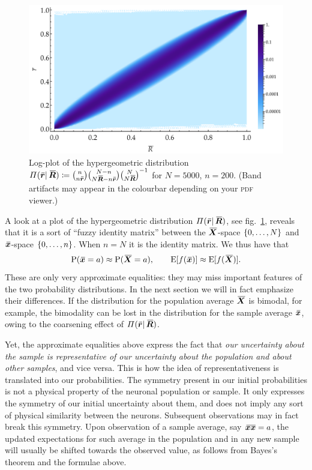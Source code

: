 \documentclass{article}
\theoremstyle{remark}
\theoremstyle{innote}
\newcommand*{\defd}{\coloneqq}
\renewcommand*{\|}{\mathpunct{|}}%
\DeclarePairedDelimiter\clcl{[}{]}
\DeclarePairedDelimiter\set{\{}{\}}
\newcommand*{\p}{\mathrm{P}}%
\newcommand*{\fig}{fig.}%
\newcommand*{\E}{\mathrm{E}}
\newcommand*{\expeb}{\E\clcl}%
\theoremstyle{simple}
\newcommand*{\widebar}[1]{{\mkern1.5mu\skew{2}\overline{\mkern-1.5mu#1\mkern-1.5mu}\mkern 1.5mu}}
\newcommand*{\av}{\widebar} %
\newcommand*{\sav}{\widebar} %
\newcommand*{\ypp}{\varPi}
\newcommand*{\yxx}{x}%
\newcommand*{\yx}{\bm{\yxx}}%
\newcommand*{\yxs}{\sav{\yx}}%
\newcommand*{\yX}{\bm{X}}%
\newcommand*{\yXf}{\av{\yX}}%
\newcommand*{\yxxs}{\sav{\yx\yx}}%
\newcommand*{\yr}{\bm{r}}%
\newcommand*{\yrs}{\sav{\yr}}%
\newcommand*{\yR}{\bm{R}}%
\newcommand*{\yRf}{\av{\yR}}%
\newcommand*{\yH}{\varIota}
\begin{document}
\begin{figure}[!t]
\centering
\includegraphics[width=0.99\linewidth]{pop_sample_projection3.pdf}%
\caption{Log-plot of the hypergeometric distribution
  $%
\ypp(\yrs\|\yRf) \defd  \binom{n}{n\yrs}\binom{N-n}{N \yRf-n\yrs}\binom{N}{N \yRf}^{-1}$ for $N=5000$, $n=200$. (Band artifacts may appear in the
  colourbar depending on your \textsc{pdf} viewer.)}
\label{fig:hypergeom_proj}
\end{figure}%
A look at a plot of the hypergeometric distribution $\ypp(\yrs\|\yRf)$, see
\fig~\ref{fig:hypergeom_proj}, reveals that it is a sort of \enquote{fuzzy
  identity matrix} between the $\yXf$-space $\set{0,\dotsc,N}$ and
$\yxs$-space $\set{0,\dotsc,n}$. When $n=N$ it is the identity matrix. We
thus have that
\begin{equation}
  \label{eq:roughly_equal_nN}
  \p(\yxs=a) \approx \p(\yXf=a),\qquad
\expeb{f(\yxs)} \approx \expeb{f(\yXf)}.
\end{equation}
These are only very approximate equalities: they may miss important
features of the two probability distributions. In the next section we will
in fact emphasize their differences. If the distribution for the population
average $\yXf$ is bimodal, for example, the bimodality can be lost in the
distribution for the sample average $\yxs$, owing to the coarsening effect
of $\ypp(\yrs\|\yRf)$.

Yet, the approximate equalities above express the fact that \emph{our
  uncertainty about the sample is representative of our uncertainty about
  the population and about other samples}, and vice versa. This is how the
idea of representativeness is translated into our probabilities. The
symmetry present in our initial probabilities is not a physical property of
the neuronal population or sample. It only expresses the symmetry of our
initial uncertainty about them, and does not imply any sort of physical
similarity between the neurons. Subsequent observations may in fact break
this symmetry. Upon observation of a sample average, say $\yxxs=a$, the
updated expectations for such average in the population and in any new
sample will usually be shifted towards the observed value, as follows from
Bayes's theorem and the formulae above.
\end{document}
